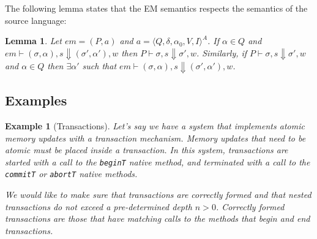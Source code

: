 \documentclass[10pt,notitlepage,twoside]{article}
\newcommand{\aut}{a}
\newcommand{\automata}[5]{\langle #1,#2,#3,#4,#5 \rangle^A}
\newcommand{\qu}{\alpha}
\newcommand{\theautomaton}{\automata{Q}{\delta}{\qu_0}{V}{I}}
\newcommand{\emdef}[2]{(#1,#2)}
\newcommand{\eval}[2]{P \vdash #1 \Downarrow #2}
\newtheorem{lemma}{Lemma}
\newtheorem{example}{Example}
\begin{document}
The following lemma states that the EM semantics respects the semantics of the source language:

\begin{lemma}
Let $em = \emdef{P}{\aut}$ and $\aut = \theautomaton$.
If $\qu \in Q$ and $em \vdash (\sigma,\qu),s \Downarrow (\sigma',\qu'),w$ then $\eval{\sigma,s}{\sigma',w}$. Similarly, if $\eval{\sigma,s}{\sigma',w}$ and $\qu \in Q$ then $\exists \qu'$ such that $em \vdash (\sigma,\qu),s \Downarrow (\sigma',\qu'),w$.
\end{lemma}

\subsection{Examples}

\begin{example}[Transactions]\label{ex:transactions-aut}
Let's say we have a system that implements atomic memory updates with a transaction mechanism. Memory updates that need to be atomic must be placed inside a transaction. In this system, transactions are started with a call to the \texttt{beginT} native method, and terminated with a call to the \texttt{commitT}  or \texttt{abortT} native methods.

We would like to make sure that transactions are correctly formed and that nested transactions do not exceed a pre-determined depth $n > 0$. Correctly formed transactions are those that have matching calls to the methods that begin and end transactions.


\end{example}
\end{document}
